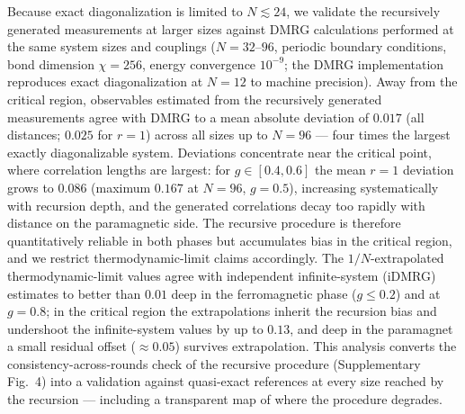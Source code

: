 
Because exact diagonalization is limited to $N\lesssim 24$, we validate
the recursively generated measurements at larger sizes against DMRG
calculations performed at the same system sizes and couplings
($N=32$--$96$, periodic boundary conditions, bond dimension $\chi=256$,
energy convergence $10^{-9}$; the DMRG implementation reproduces exact
diagonalization at $N=12$ to machine precision). Away from the critical
region, observables estimated from the recursively generated measurements
agree with DMRG to a mean absolute deviation of $0.017$ (all distances;
$0.025$ for $r=1$) across all sizes up to $N=96$ --- four times the largest
exactly diagonalizable system. Deviations concentrate near the critical
point, where correlation lengths are largest: for $g\in[0.4,0.6]$ the mean
$r{=}1$ deviation grows to $0.086$ (maximum $0.167$ at $N=96$, $g=0.5$),
increasing systematically with recursion depth, and the generated
correlations decay too rapidly with distance on the paramagnetic side.
The recursive procedure is therefore quantitatively reliable in both
phases but accumulates bias in the critical region, and we restrict
thermodynamic-limit claims accordingly. The $1/N$-extrapolated thermodynamic-limit values agree with independent
infinite-system (iDMRG) estimates to better than $0.01$ deep in the
ferromagnetic phase ($g\le0.2$) and at $g=0.8$; in the critical region the
extrapolations inherit the recursion bias and undershoot the
infinite-system values by up to $0.13$, and deep in the paramagnet a small
residual offset ($\approx0.05$) survives extrapolation. This analysis
converts the consistency-across-rounds
check of the recursive procedure (Supplementary Fig.~4) into a validation
against quasi-exact references at every size reached by the recursion ---
including a transparent map of where the procedure degrades.



